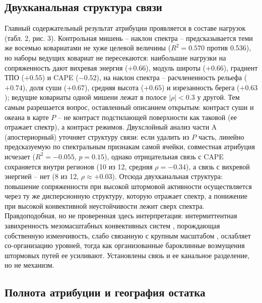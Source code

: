 \documentclass[12pt,a4paper]{article}
\begin{document}
\subsection{Двухканальная структура связи}

Главный содержательный результат атрибуции проявляется в составе нагрузок (табл. 2, рис. 3). Контрольная мишень -- наклон спектра -- предсказывается теми же восемью ковариатами не хуже целевой величины ($R^2 = 0.570$ против 0.536), но наборы ведущих ковариат не пересекаются: наибольшие нагрузки на сопряженность дают вихревая энергия ($+0.66$), модуль широты ($+0.66$), градиент ТПО ($+0.55$) и CAPE ($-0.52$), на наклон спектра -- расчлененность рельефа ($+0.74$), доля суши ($+0.67$), средняя высота ($+0.65$) и изрезанность берега ($+0.63$); ведущие ковариаты одной мишени лежат в полосе $|\rho| < 0.3$ у другой. Тем самым разрешается вопрос, оставленный описанием открытым: контраст суши и океана в карте $P$ -- не контраст подстилающей поверхности как таковой (ее отражает спектр), а контраст режимов. Двухслойный анализ части A (апостериорный) уточняет структуру связи: если удалить из $P$ часть, линейно предсказуемую по спектральным признакам самой ячейки, совместная атрибуция исчезает ($R^2 = -0.055$, $p = 0.15$), однако отрицательная связь с CAPE сохраняется внутри регионов (10 из 12, средняя $\rho = -0.34$), а связь с вихревой энергией -- нет (8 из 12, $\rho \approx +0.03$). Отсюда двухканальная структура: повышение сопряженности при высокой штормовой активности осуществляется через ту же дисперсионную структуру, которую отражает спектр, а понижение при высокой конвективной неустойчивости лежит сверх спектра. Правдоподобная, но не проверенная здесь интерпретация: интермиттентная завихренность мезомасштабных конвективных систем \cite{Houze2004,PetersNeelin2006}, порождающая собственную изменчивость, слабо связанную с крупным масштабом \cite{Zhang2007,RotunnoSnyder2008,Judt2020}, ослабляет со-организацию уровней, тогда как организованные бароклинные возмущения штормовых путей ее усиливают. Установлены связь и ее канальное разделение, но не механизм.

\subsection{Полнота атрибуции и география остатка}
\end{document}

